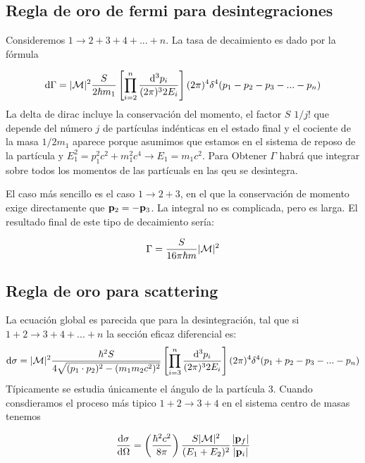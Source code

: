 \subsection{Regla de oro de fermi para desintegraciones}

Consideremos $1 \to 2+3+4+...+n$. La tasa de decaimiento es dado por la fórmula 

\begin{equation}
    \mathrm{d} \Gamma = |\mathcal{M}|^2 \frac{S}{2 \hbar m_1} \left[  \prod_{i=2}^n \frac{\mathrm{d}^3 p_i}{(2\pi)^3 2E_i} \right] (2\pi)^4 \delta^4 (p_1 - p_2 - p_3 - ... - p_n)
\end{equation}
La delta de dirac incluye la conservación del momento, el factor $S$ $1/j!$ que depende del número $j$ de partículas indénticas en el estado final y el cociente de la masa $1/2m_1$ aparece porque asumimos que estamos en el sistema de reposo de la partícula y $E_1^2 = p_1^2 c^2 + m_1^2 c^4 \to E_1 = m_1 c^2$. Para Obtener $\Gamma$ habrá que integrar sobre todos los momentos de las partícuals en las qeu se desintegra. 


El caso más sencillo es el caso $1 \to 2 + 3$, en el que la conservación de momento exige directamente que $\mathbf{p}_2 = -\mathbf{p}_3$. La integral no es complicada, pero es larga. El resultado final de este tipo de decaimiento sería: 

\begin{equation*}
    \Gamma = \frac{S}{16 \pi \hbar m} |\mathcal{M}|^2
\end{equation*}


\subsection{Regla de oro para scattering}

La ecuación global es parecida que para la desintegración, tal que si $1+2 \to 3+4+...+n$ la sección eficaz diferencial es: 
\begin{equation}
    \mathrm{d} \sigma = |\mathcal{M}|^2 \frac{\hbar^2 S}{4 \sqrt{(p_1\cdot p_2)^2 - (m_1m_2c^2)^2}} \left[  \prod_{i=3}^n \frac{\mathrm{d}^3 p_i}{(2\pi)^3 2E_i} \right] (2\pi)^4 \delta^4 (p_1 + p_2 - p_3 - ... - p_n)
\end{equation}
Típicamente se estudia únicamente el ángulo de la partícula 3. Cuando consdieramos el proceso más tipico $1+2 \to 3+4$ en el sistema centro de masas tenemos 

\begin{equation}
    \dv{\sigma}{\Omega} = \left( \frac{\hbar^2 c^2}{8 \pi} \right) \frac{S |\mathcal{M}|^2}{(E_1+E_2)^2} \frac{|\mathbf{p}_f|}{|\mathbf{p}_i|}
\end{equation}

